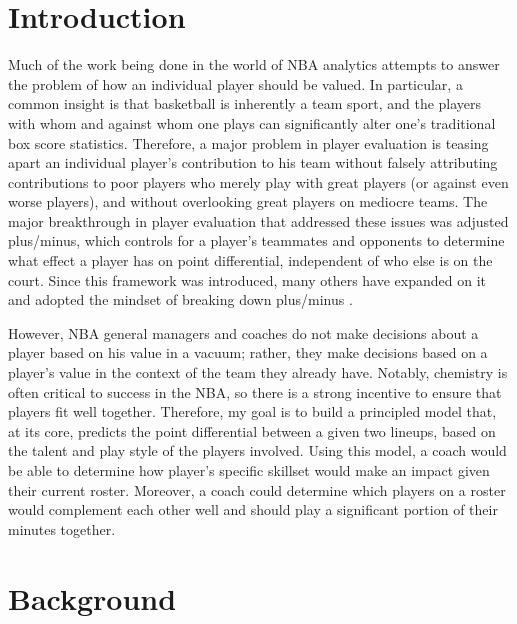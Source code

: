 \documentclass[12pt]{article}
\begin{document}
\maketitle

\doublespacing

\section{Introduction} \label{intro}

Much of the work being done in the world of NBA analytics attempts to answer
the problem of how an individual player should be valued. In particular, a
common insight is that basketball is inherently a team sport, and the players
with whom and against whom one plays can significantly alter one's traditional
box score statistics. Therefore, a major problem in player evaluation is
teasing apart an individual player's contribution to his team without falsely
attributing contributions to poor players who merely play with great players
(or against even worse players), and without overlooking great players on
mediocre teams. The major breakthrough in player evaluation that addressed
these issues was adjusted plus/minus\cite{rosenbaum_2004}, which controls for a
player's teammates and opponents to determine what effect a player has on point
differential, independent of who else is on the court. Since this framework was
introduced, many others have expanded on it and adopted the mindset of breaking
down plus/minus \cite{englemann_2015}\cite{sill_2010}\cite{myers_2011}.

However, NBA general managers and coaches do not make decisions about a player
based on his value in a vacuum; rather, they make decisions based on a player's
value in the context of the team they already have. Notably, chemistry is often
critical to success in the NBA, so there is a strong incentive to ensure that
players fit well together\cite{schrage_2014}. Therefore, my goal is to build a
principled model that, at its core, predicts the point differential between a
given two lineups, based on the talent and play style of the players involved.
Using this model, a coach would be able to determine how player's specific
skillset would make an impact given their current roster. Moreover, a coach
could determine which players on a roster would complement each other well and
should play a significant portion of their minutes together.

\section{Background} \label{background}
\end{document}
